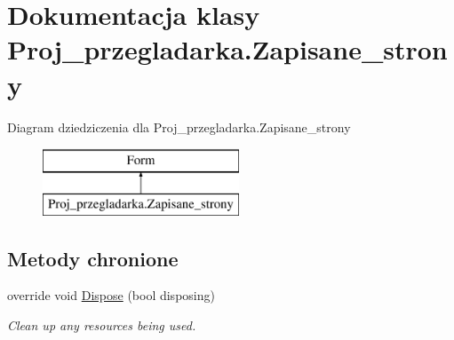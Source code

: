 \hypertarget{class_proj__przegladarka_1_1_zapisane__strony}{}\section{Dokumentacja klasy Proj\+\_\+przegladarka.\+Zapisane\+\_\+strony}
\label{class_proj__przegladarka_1_1_zapisane__strony}
Diagram dziedziczenia dla Proj\+\_\+przegladarka.\+Zapisane\+\_\+strony\begin{figure}[H]
\begin{center}
\leavevmode
\includegraphics[height=2.000000cm]{class_proj__przegladarka_1_1_zapisane__strony}
\end{center}
\end{figure}
\subsection*{Metody chronione}
\begin{DoxyCompactItemize}
\item 
override void \mbox{\hyperlink{class_proj__przegladarka_1_1_zapisane__strony_afef5ceee204e7eeafed0f3a4c4a06cbd}{Dispose}} (bool disposing)
\begin{DoxyCompactList}\small\item\em Clean up any resources being used. \end{DoxyCompactList}\end{DoxyCompactItemize}
